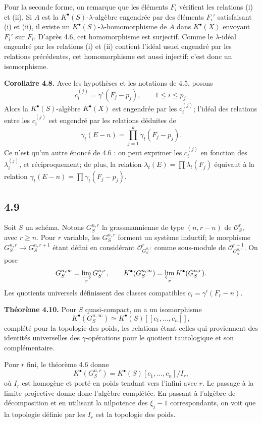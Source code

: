 \documentclass[11pt]{article}
\begin{document}
Pour la seconde forme, on remarque que les éléments \(F_i\) vérifient les relations (i) et (ii). Si \(A\) est la \(K^\bullet(S)\)-\(\lambda\)-algèbre engendrée par des éléments \(F_i'\) satisfaisant (i) et (ii), il existe un \(K^\bullet(S)\)-\(\lambda\)-homomorphisme de \(A\) dans \(K^\bullet(X)\) envoyant \(F_i'\) sur \(F_i\). D'après 4.6, cet homomorphisme est surjectif. Comme le \(\lambda\)-idéal engendré par les relations (i) et (ii) contient l'idéal usuel engendré par les relations précédentes, cet homomorphisme est aussi injectif; c'est donc un isomorphisme.

\textbf{Corollaire 4.8.} Avec les hypothèses et les notations de 4.5, posons
\[
  c_i^{(j)}=\gamma^i(F_j-p_j),
  \qquad 1\le i\le p_j.
\]
Alors la \(K^\bullet(S)\)-algèbre \(K^\bullet(X)\) est engendrée par les \(c_i^{(j)}\); l'idéal des relations entre les \(c_i^{(j)}\) est engendré par les relations déduites de
\[
  \gamma_t(E-n)=\prod_{j=1}^{k}\gamma_t(F_j-p_j).
\]
Ce n'est qu'un autre énoncé de 4.6 : on peut exprimer les \(c_i^{(j)}\) en fonction des \(\lambda_i^{(j)}\), et réciproquement; de plus, la relation \(\lambda_t(E)=\prod\lambda_t(F_j)\) équivaut à la relation \(\gamma_t(E-n)=\prod\gamma_t(F_j-p_j)\).

\subsection*{4.9}
Soit \(S\) un schéma. Notons \(G_S^{n,r}\) la grassmannienne de type \((n,r-n)\) de \(\mathcal O_S^r\), avec \(r\ge n\). Pour \(r\) variable, les \(G_S^{n,r}\) forment un système inductif; le morphisme \(G_S^{n,r}\to G_S^{n,r+1}\) étant défini en considérant \(\mathcal O_{G_S^{n,r}}^r\) comme sous-module de \(\mathcal O_{G_S^{n,r}}^{r+1}\). On pose
\[
  G_S^{n,\infty}=\varinjlim_r G_S^{n,r},
  \qquad
  K^\bullet(G_S^{n,\infty})=\varprojlim_r K^\bullet(G_S^{n,r}).
\]
Les quotients universels définissent des classes compatibles \(c_i=\gamma^i(F_r-n)\).

\textbf{Théorème 4.10.} Pour \(S\) quasi-compact, on a un isomorphisme
\[
  K^\bullet(G_S^{n,\infty})\simeq K^\bullet(S)[[c_1,\ldots,c_n]],
\]
complété pour la topologie des poids, les relations étant celles qui proviennent des identités universelles des \(\gamma\)-opérations pour le quotient tautologique et son complémentaire.

Pour \(r\) fini, le théorème 4.6 donne
\[
  K^\bullet(G_S^{n,r})=K^\bullet(S)[c_1,\ldots,c_n]/I_r,
\]
où \(I_r\) est homogène et porté en poids tendant vers l'infini avec \(r\). Le passage à la limite projective donne donc l'algèbre complétée. En passant à l'algèbre de décomposition et en utilisant la nilpotence des \(\xi_j-1\) correspondants, on voit que la topologie définie par les \(I_r\) est la topologie des poids.
\end{document}
